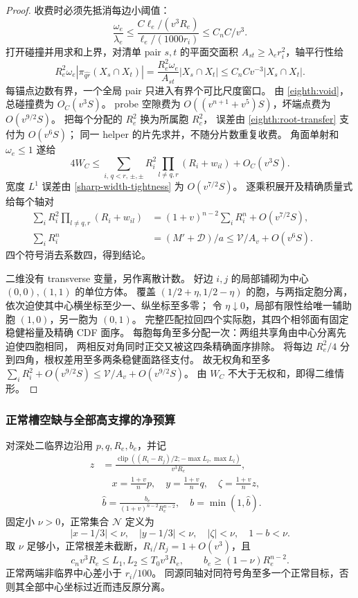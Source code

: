 \begin{proof}
收费时必须先抵消每边小阈值：
\begin{equation}\label{eighth:threshold-cancel}
 \frac{\omega_e}{\lambda_e}
 \le\frac{C\ell_e/(v^3R_e)}{\ell_e/(1000r_i)}
 \le C_nC/v^3.
\end{equation}
打开碰撞并用求和上界，对清单 pair \(s,t\) 的平面交面积
\(A_{st}\ge\lambda_er_i^2\)，轴平行性给
\[
 R_e^2\omega_e|\pi_{\widehat{qr}}(X_s\cap X_t)|
 =\frac{R_e^2\omega_e}{A_{st}}|X_s\cap X_t|
 \le C_nC v^{-3}|X_s\cap X_t|.
\]
每锚点边数有界，一个全局 pair 只进入有界个可比尺度窗口。
由 \eqref{eighth:void}，总碰撞费为 \(O_C(v^3S)\)。
probe 空隙费为 \(O((v^{n+1}+v^5)S)\)，坏端点费为 \(O(v^{9/2}S)\)。
把每个分配的 \(R_e^2\) 换为所属胞 \(R_c^2\)，
误差由 \eqref{eighth:root-transfer} 支付为 \(O(v^6S)\)；
同一 helper 的片先求并，不随分片数重复收费。
角面单射和 \(\omega_e\le1\) 遂给
\[
 4W_C\le\sum_{i,\,q<r,\,\pm,\pm}
 R_i^2\prod_{l\ne q,r}(R_i+w_{il})+O_C(v^3S).
\]
宽度 \(L^1\) 误差由 \eqref{sharp-width-tightness} 为 \(O(v^{7/2}S)\)。
逐乘积展开及精确质量式给每个轴对
\[
 \begin{aligned}
 \sum_iR_i^2\prod_{l\ne q,r}(R_i+w_{il})
 &=(1+v)^{n-2}\sum_iR_i^n+O(v^{7/2}S),\qquad\\
 \sum_iR_i^n&=(M'+\mathcal D)/a\le\mathcal V/A_v+O(v^6S).
 \end{aligned}
\]
四个符号消去系数四，得到结论。

二维没有 transverse 变量，另作离散计数。
好边 \(i,j\) 的局部铺砌为中心 \((0,0),(1,1)\) 的单位方体。
覆盖 \((1/2+\eta,1/2-\eta)\) 的胞，与两指定胞分离，
依次迫使其中心横坐标至少一、纵坐标至多零；
令 \(\eta\downarrow0\)，局部有限性给唯一辅助胞 \((1,0)\)，另一胞为 \((0,1)\)。
完整匹配拉回四个实际胞，其四个相邻面有固定稳健裕量及精确 CDF 面序。
每胞每角至多分配一次：两组共享角由中心分离先迫使四胞相同，
两相反对角同时正交又被这四条精确面序排除。
将每边 \(R_e^2/4\) 分到四角，根权差用至多两条稳健面路径支付。
故无权角和至多 \(\sum_iR_i^2+O(v^{9/2}S)\le\mathcal V/A_v+O(v^{9/2}S)\)。
由 \(W_C\) 不大于无权和，即得二维情形。
\end{proof}

\subsubsection{正常槽空缺与全部高支撑的净预算}

对深处二临界边沿用 \(p,q,R_e,b_e\)，并记
\[
 \begin{aligned}
 z&=\frac{\operatorname{clip}((R_i-R_j)/2;-\max L_l,\max L_l)}{v^3R_e},\\
 &\quad x=\frac{1+v}{n}p,\quad y=\frac{1+v}{n}q,\quad
 \zeta=\frac{1+v}{n}z,\quad\\
 &\widehat b=\frac{b_e}{(1+v)^{n-2}R_e^{n-2}},\quad b=\min(1,\widehat b).
 \end{aligned}
\]
固定小 \(\nu>0\)，正常集合 \(\mathcal N\) 定义为
\begin{equation}\label{eighth:normal}
 |x-1/3|<\nu,\quad |y-1/3|<\nu,\quad|\zeta|<\nu,\quad1-b<\nu.
\end{equation}
取 \(\nu\) 足够小，正常根差未截断，\(R_i/R_j=1+O(v^3)\)，且
\[
 c_nv^3R_e\le L_1,L_2\le T_0v^3R_e,\qquad
 b_e\ge(1-\nu)R_e^{n-2}.
\]
正常两端非临界中心差小于 \(r_i/100\)。
同源同轴对同符号角至多一个正常目标，否则其全部中心坐标过近而违反原分离。

